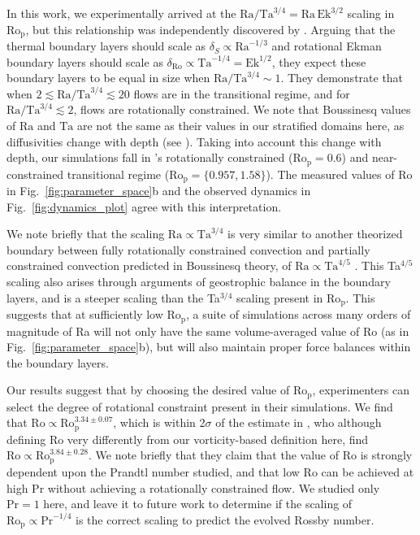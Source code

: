 \documentclass[twocolumn, amsmath, amsfonts, amssymb, trackchanges]{aastex62}
\newcommand{\pro}{\ensuremath{\text{Ro}_{\text{p}}}}
\begin{document}
In this work, we experimentally arrived at the 
$\text{Ra}/\text{Ta}^{3/4} = \text{Ra}\,\text{Ek}^{3/2}$
scaling in \pro, but this relationship was independently
discovered by \cite{king&all2012}. Arguing that the thermal boundary layers should
scale as $\delta_{S} \propto \text{Ra}^{-1/3}$ and rotational Ekman boundary layers
should scale as $\delta_{\text{Ro}} \propto \text{Ta}^{-1/4} = \text{Ek}^{1/2}$, they
expect these boundary layers to be equal in size when $\text{Ra}/\text{Ta}^{3/4} \sim 1$.
They demonstrate that when $2 \lesssim\text{Ra}/\text{Ta}^{3/4} \lesssim 20$ flows are in the
transitional regime, and for $\text{Ra}/\text{Ta}^{3/4} \lesssim 2$, flows are rotationally
constrained. We note that Boussinesq values of $\text{Ra}$ and $\text{Ta}$ are not the same as their
values in our stratified domains here, as diffusivities change with depth (see \AB). 
Taking into account this change with depth,
our simulations fall in \cite{king&all2012}'s rotationally constrained
($\pro = 0.6$) and near-constrained transitional regime ($\pro = \{0.957, 1.58\}$).
The measured values of Ro in Fig.~\ref{fig:parameter_space}b and the observed dynamics
in Fig.~\ref{fig:dynamics_plot} agree with this interpretation.

We note briefly that the scaling $\text{Ra} \propto \text{Ta}^{3/4}$ is very similar to
another theorized boundary between fully rotationally constrained convection and 
partially constrained convection predicted in Boussinesq theory, of 
$\text{Ra} \propto \text{Ta}^{4/5}$ \citep{julien&all2012, gastine&all2016}. This
Ta$^{4/5}$ scaling also arises through arguments of geostrophic balance in the boundary layers,
and is a steeper scaling than the Ta$^{3/4}$ scaling present in \pro.
This suggests that at sufficiently low \pro, a suite of simulations across many orders
of magnitude of Ra will not only have the same volume-averaged value of Ro 
(as in Fig.~\ref{fig:parameter_space}b), but will
also maintain proper force balances within the boundary layers.

Our results suggest that by choosing the desired value of \pro, experimenters
can select the degree of rotational constraint present in their simulations. 
We find that $\text{Ro} \propto \text{Ro}_\text{p}^{3.34 \pm 0.07}$, which is within
2$\sigma$ of the estimate in \cite{king&all2013}, who although defining
Ro very differently from our vorticity-based definition here, find 
$\text{Ro} \propto \text{Ro}_\text{p}^{3.84 \pm 0.28}$. We note briefly that they
claim that the value of $\text{Ro}$ is strongly dependent upon the Prandtl number studied, and
that low Ro can be achieved at high Pr without achieving a rotationally constrained flow.
We studied only $\text{Pr} = 1$ here, and leave it to future work to determine if
the scaling of $\text{Ro}_{\text{p}} \propto \text{Pr}^{-1/4}$ is the correct scaling to
predict the evolved Rossby number.
\end{document}
